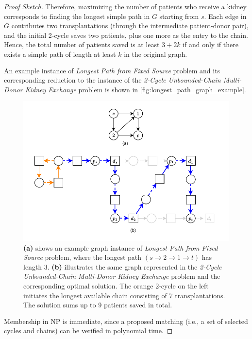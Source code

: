 \begin{proof}[Proof Sketch]
Therefore, maximizing the number of patients who receive a kidney corresponds to finding the longest simple path in $G$ starting from $s$. Each edge in $G$ contributes two transplantations (through the intermediate patient-donor pair), and the initial 2-cycle saves two patients, plus one more as the entry to the chain. Hence, the total number of patients saved is at least $3 + 2k$ if and only if there exists a simple path of length at least $k$ in the original graph.

An example instance of \textit{Longest Path from Fixed Source} problem and its corresponding reduction to the instance of the \textit{2-Cycle Unbounded-Chain Multi-Donor Kidney Exchange} problem is shown in \autoref{fig:longest_path_graph_example}.

\begin{figure}
    \centering
    \includegraphics{data/longest_path_graph_example.pdf}
    \caption[An example instance of \textit{Longest Path from Fixed Source} problem and its corresponding reduction to the instance of the \textit{2-Cycle Unbounded-Chain Multi-Donor Kidney Exchange} problem]{\textbf{(a)} shows an example graph instance of \textit{Longest Path from Fixed Source} problem, where the longest path $(s \rightarrow 2 \rightarrow 1 \rightarrow t)$ has length 3. \textbf{(b)} illustrates the same graph represented in the \textit{2-Cycle Unbounded-Chain Multi-Donor Kidney Exchange} problem and the corresponding optimal solution. The orange 2-cycle on the left initiates the longest available chain consisting of 7 transplantations. The solution sums up to 9 patients saved in total.}
    \label{fig:longest_path_graph_example}
\end{figure}

Membership in NP is immediate, since a proposed matching (i.e., a set of selected cycles and chains) can be verified in polynomial time.
\end{proof}

